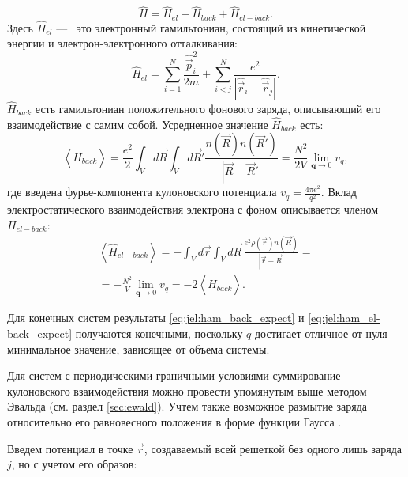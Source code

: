 \begin{equation}
    \label{eq:jel:ham_four_sum}
    \hat{H}=\hat{H}_{e l}+\hat{H}_{b a c k}+\hat{H}_{e l-b a c k}.
\end{equation}
Здесь $\hat{H}_{e l}$ ---~ это электронный гамильтониан, состоящий из кинетической энергии и электрон-электронного отталкивания:
\begin{equation}
    \label{eq:jel:ham_el_def}
    \hat{H}_{e l}=\sum_{i=1}^{N} \frac{\hat{\vec{p}}_i^2}{2 m}+\sum_{i<j}^{N} \frac{e^{2}}{\left|\hat{\vec{r}}_{i}-\hat{\vec{r}}_{j}\right|}.
\end{equation}
%
$\hat{H}_{b a c k}$ есть гамильтониан положительного фонового заряда, описывающий его взаимодействие с самим собой. Усредненное значение $\hat{H}_{b a c k}$ есть:
\begin{equation}
    \label{eq:jel:ham_back_expect}
    \left\langle\hat{H}_{b a c k}\right\rangle
    = \frac{e^{2}}{2} \int_{V} d \vec{R} \int_{V} d \vec{R}' \frac{n(\vec{R}) n\left(\vec{R}'\right)}{\left|\vec{R}-\vec{R}'\right|}
    = \frac{N^{2}}{2 V} \lim _{\mathbf{q} \rightarrow 0} v_{q},
\end{equation}
где введена фурье-компонента кулоновского потенциала $v_{q}=\frac{4 \pi e^{2}}{q^{2}}$.
%
Вклад электростатического взаимодействия электрона с фоном описывается членом $H_{el-back}$:
\begin{multline}
    \label{eq:jel:ham_el-back_expect}
    \left\langle\hat{H}_{e l-b a c k}\right\rangle
    = -\int_{V} d \vec{r} \int_{V} d \vec{R}\, \frac{e^{2} \rho(\vec{r}) n(\vec{R})}{|\vec{r}-\vec{R}|} = {} \\
    = -\frac{N^{2}}{V} \lim _{\mathbf{q} \rightarrow 0} v_{q}
    = -2 \left\langle\hat{H}_{b a c k}\right\rangle.
\end{multline}

Для конечных систем результаты \eqref{eq:jel:ham_back_expect} и \eqref{eq:jel:ham_el-back_expect} получаются конечными, поскольку $q$ достигает отличное от нуля минимальное значение, зависящее от объема системы.

Для систем с периодическими граничными условиями суммирование кулоновского взаимодействия можно провести упомянутым выше методом Эвальда (см. раздел \ref{sec:ewald}).
Учтем также возможное размытие заряда относительно его равновесного положения в форме функции Гаусса \cite{jel:blinov}.

Введем потенциал в точке $\vec{r}$, создаваемый всей решеткой без одного лишь заряда $j$, но с учетом его образов:

